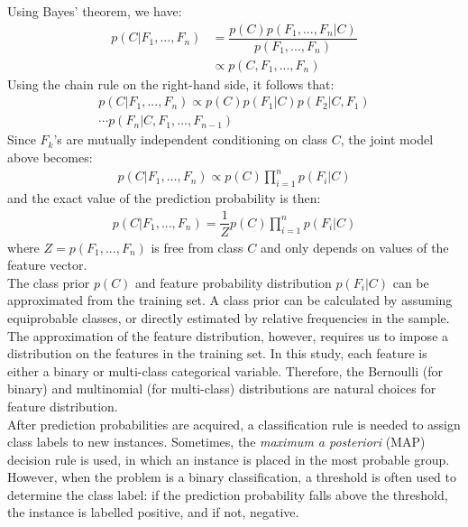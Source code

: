 \documentclass{article}
\begin{document}
\begin{multicols}{2}
Using Bayes' theorem, we have:
\begin{align*}
p(C\vert F_1,...,F_n) &= \dfrac{p(C)p(F_1,...,F_n\vert C)}{p(F_1,...,F_n)}\\
&\propto p(C,F_1,...,F_n)
\end{align*}
Using the chain rule on the right-hand side, it follows that:
\begin{align*}
p(C\vert F_1,...,F_n) \propto p(C)p(F_1\vert C)p(F_2\vert C,F_1)\\
\dotsb p(F_n\vert C,F_1,...,F_{n-1})
\end{align*}
Since $F_k$'s are mutually independent conditioning on class $C$, the joint model above becomes:
\begin{align*}
p(C\vert F_1,...,F_n) \propto p(C)\prod\limits_{i=1}^n p(F_i\vert C)
\end{align*}
and the exact value of the prediction probability is then:
\begin{align*}
p(C\vert F_1,...,F_n) = \dfrac{1}{Z} p(C)\prod\limits_{i=1}^n p(F_i\vert C)
\end{align*}
where $Z=p(F_1,...,F_n)$ is free from class $C$ and only depends on values of the feature vector.\\

The class prior $p(C)$ and feature probability distribution $p(F_i\vert C)$ can be approximated from the training set. A class prior can be calculated by assuming equiprobable classes, or directly estimated by relative frequencies in the sample. The approximation of the feature distribution, however, requires us to impose a distribution on the features in the training set. In this study, each feature is either a binary or multi-class categorical variable. Therefore, the Bernoulli (for binary) and multinomial (for multi-class) distributions are natural choices for feature distribution.\\

After prediction probabilities are acquired, a classification rule is needed to assign class labels to new instances. Sometimes, the \textit{maximum a posteriori} (MAP) decision rule is used, in which an instance is placed in the most probable group. However, when the problem is a binary classification, a threshold is often used to determine the class label: if the prediction probability falls above the threshold, the instance is labelled positive, and if not, negative.\\


\end{multicols}
\end{document}
